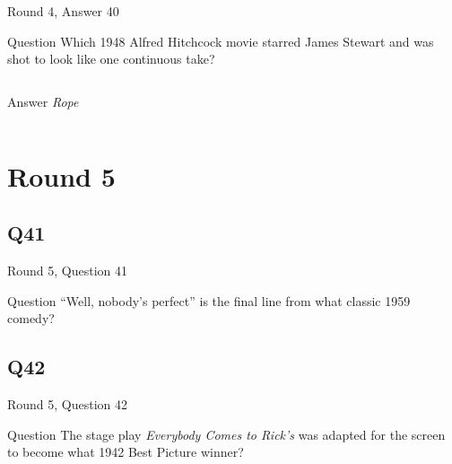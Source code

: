 \documentclass[11pt]{beamer}
\begin{document}
\begin{frame}[t]{Round 4, Answer 40}
\vspace{2em}
\begin{block}{Question}
Which 1948 Alfred Hitchcock movie starred James Stewart and was shot to look like one continuous take?
\end{block}
\pause{}
\begin{columns}[T,totalwidth=\linewidth]
\begin{column}{0.35\linewidth}
\begin{block}{Answer}
\emph{Rope}
\end{block}
\end{column}
\begin{column}{0.6\linewidth}
\begin{center}
\texttt{[image: \{Images/rope-movie-poster-1948-1020196578]}.jpg}
\end{center}
\end{column}
\end{columns}
\end{frame}
    

\section{Round 5}
    

\subsection*{Q41}
\begin{frame}[t]{Round 5, Question 41}
\vspace{2em}
\begin{block}{Question}
``Well, nobody's perfect'' is the final line from what classic 1959 comedy?
\end{block}
\end{frame}
    

\subsection*{Q42}
\begin{frame}[t]{Round 5, Question 42}
\vspace{2em}
\begin{block}{Question}
The stage play \emph{Everybody Comes to Rick's} was adapted for the screen to become what 1942 Best Picture winner?
\end{block}
\end{frame}
    
\end{document}
